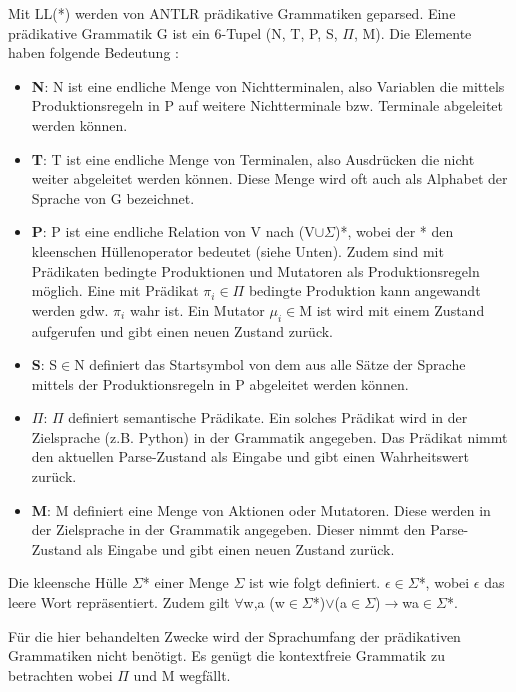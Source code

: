 Mit LL(*) werden von ANTLR prädikative Grammatiken geparsed. Eine prädikative Grammatik G ist ein 6-Tupel (N, T, P, S, $\Pi$, M). Die Elemente haben folgende Bedeutung \cite{ll_star_parser}:
\begin{itemize}
\item \textbf{N}: N ist eine endliche Menge von Nichtterminalen, also Variablen die mittels Produktionsregeln in P auf weitere Nichtterminale bzw. Terminale abgeleitet werden können.

\item \textbf{T}: T ist eine endliche Menge von Terminalen, also Ausdrücken die nicht weiter abgeleitet werden können. Diese Menge wird oft auch als Alphabet der Sprache von G bezeichnet.

\item \textbf{P}: P ist eine endliche Relation von V nach (V$\cup\Sigma$)*, wobei der * den kleenschen Hüllenoperator bedeutet (siehe Unten). Zudem sind mit Prädikaten bedingte Produktionen und Mutatoren als Produktionsregeln möglich. Eine mit Prädikat $\pi_{i}\in\Pi$ bedingte Produktion kann angewandt werden gdw. $\pi_{i}$ wahr ist. Ein Mutator $\mu_{i}\in$M ist wird mit einem Zustand aufgerufen und gibt einen neuen Zustand zurück.

\item \textbf{S}: S$\in$N definiert das Startsymbol von dem aus alle Sätze der Sprache mittels der Produktionsregeln in P abgeleitet werden können.

\item \textbf{$\Pi$}: $\Pi$ definiert semantische Prädikate. Ein solches Prädikat wird in der Zielsprache (z.B. Python) in der Grammatik angegeben. Das Prädikat nimmt den aktuellen Parse-Zustand als Eingabe und gibt einen Wahrheitswert zurück.

\item \textbf{M}: M definiert eine Menge von Aktionen oder Mutatoren. Diese werden in der Zielsprache in der Grammatik angegeben. Dieser nimmt den Parse-Zustand als Eingabe und gibt einen neuen Zustand zurück.
\end{itemize}

Die kleensche Hülle $\Sigma$* einer Menge $\Sigma$ ist wie folgt definiert. $\epsilon\in\Sigma$*, wobei $\epsilon$ das leere Wort repräsentiert. Zudem gilt $\forall$w,a (w$\in\Sigma$*)$\vee$(a$\in\Sigma$)$\rightarrow$wa$\in\Sigma$*. \cite{compiler_dragon_book}

Für die hier behandelten Zwecke wird der Sprachumfang der prädikativen Grammatiken nicht benötigt. Es genügt die kontextfreie Grammatik zu betrachten wobei $\Pi$ und M wegfällt.

